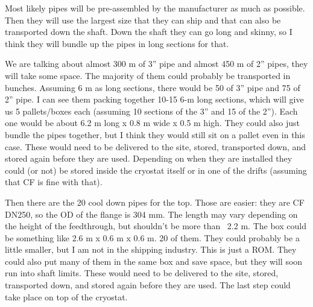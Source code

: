

Most likely pipes will be pre-assembled by the manufacturer as much as possible. Then they will use the largest size that they can ship and that can also be transported down the shaft.
Down the shaft they can go long and skinny, so I think they will bundle up the pipes in long sections for that.

We are talking about almost 300 m of 3” pipe and almost 450 m of 2” pipes, they will take some space.
The majority of them could probably be transported in bunches. Assuming 6 m as long sections, there would be 50 of 3” pipe and 75 of 2” pipe.
I can see them packing together 10-15 6-m long sections, which will give us 5 pallets/boxes each (assuming 10 sections of the 3” and 15 of the 2”).
Each one would be about 6.2 m long x 0.8 m wide x 0.5 m high. They could also just bundle the pipes together, but I think they would still sit on a
pallet even in this case. These would need to be delivered to the site, stored, transported down, and stored again before they are used.
Depending on when they are installed they could (or not) be stored inside the cryostat itself or in one of the drifts (assuming that CF is fine with that).

Then there are the 20 cool down pipes for the top. Those are easier: they are CF DN250, so the OD of the flange is 304 mm.
The length may vary depending on the height of the feedthrough, but shouldn’t be more than ~2.2 m. The box could be something like 2.6 m x 0.6 m x 0.6 m. 20 of them.
They could probably be a little smaller, but I am not in the shipping industry. This is just a ROM. They could also put many of them in the same box and save space,
but they will soon run into shaft limits. These would need to be delivered to the site, stored, transported down, and stored again before they are used.
The last step could take place on top of the cryostat.












